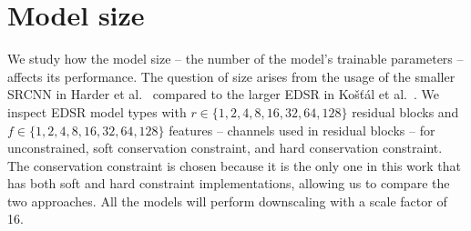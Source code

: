 \section{Model size}
\label{s:models_size_exp}

We study how the model size -- the number of the model's trainable parameters -- affects its performance.
The question of size arises from the usage of the smaller SRCNN in Harder et al.~\cite{Harder2023} compared to the larger EDSR in Košťál et al.~\cite{Kostal2025}.
We inspect EDSR model types with $r \in\{ 1, 2, 4, 8, 16, 32, 64, 128 \}$ residual blocks and $f \in\{ 1, 2, 4, 8, 16, 32, 64, 128 \}$ features -- channels used in residual blocks -- for unconstrained, soft conservation constraint, and hard conservation constraint.
The conservation constraint is chosen because it is the only one in this work that has both soft and hard constraint implementations, allowing us to compare the two approaches.
All the models will perform downscaling with a scale factor of 16.

